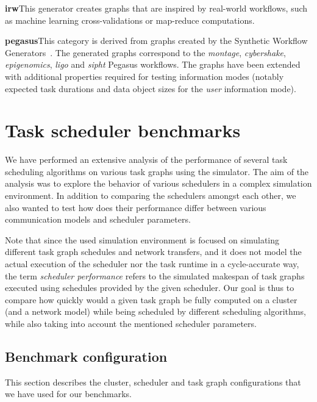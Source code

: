\vspace{1mm}\noindent\textbf{irw}\quad This generator creates graphs that are
inspired by real-world workflows, such as machine learning cross-validations or map-reduce
computations.

\vspace{1mm}\noindent\textbf{pegasus}\quad This category is derived from graphs
created by the Synthetic Workflow Generators~\cite{pegasusgraphs}. The generated graphs
correspond to the \emph{montage}, \emph{cybershake}, \emph{epigenomics},
\emph{ligo} and \emph{sipht} Pegasus workflows. The graphs have been
extended with additional properties required for testing information modes (notably expected task
durations and data object sizes for the \emph{user} information mode).

\section{Task scheduler benchmarks}
\label{sec:estee-benchmarks}
We have performed an extensive analysis of the performance of several task scheduling algorithms on
various task graphs using the \estee{} simulator. The aim of the analysis was to
explore the behavior of various schedulers in a complex simulation environment. In addition to
comparing the schedulers amongst each other, we also wanted to test how does their performance
differ between various communication models and scheduler parameters.

Note that since the used simulation environment is focused on simulating different task graph
schedules and network transfers, and it does not model the actual execution of the scheduler nor
the task runtime in a cycle-accurate way, the term \emph{scheduler performance} refers to the simulated
makespan of task graphs executed using schedules provided by the given scheduler. Our goal is thus
to compare how quickly would a given task graph be fully computed on a cluster (and a network
model) while being scheduled by different scheduling algorithms, while also taking into account the
mentioned scheduler parameters.

\subsection{Benchmark configuration}
This section describes the cluster, scheduler and task graph configurations that we have used for
our benchmarks.

